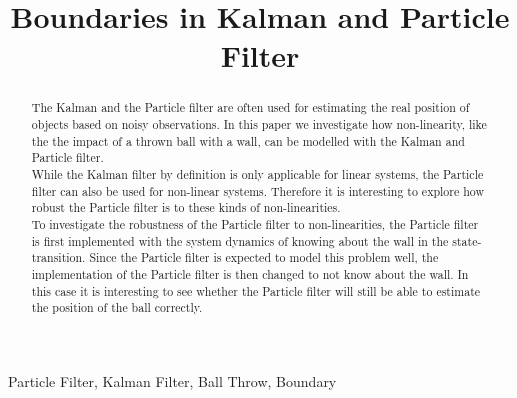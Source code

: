 \documentclass[conference]{IEEEtran}
\begin{document}
\title{Boundaries in Kalman and Particle Filter}

\author{
}
\maketitle

\begin{abstract}
The Kalman and the Particle filter are often used for estimating the real position of objects based on noisy observations.
In this paper we investigate how non-linearity, like the the impact of a thrown ball with a wall, can be modelled with the Kalman and Particle filter. \\
While the Kalman filter by definition is only applicable for linear systems, the Particle filter can also be used for non-linear systems.
Therefore it is interesting to explore how robust the Particle filter is to these kinds of non-linearities. \\
To investigate the robustness of the Particle filter to non-linearities, the Particle filter is first implemented with the system dynamics of knowing about the wall in the state-transition. 
Since the Particle filter is expected to model this problem well, the implementation of the Particle filter is then changed to not know about the wall.
In this case it is interesting to see whether the Particle filter will still be able to estimate the position of the ball correctly. 
\end{abstract}

\begin{IEEEkeywords}
Particle Filter, Kalman Filter, Ball Throw, Boundary
\end{IEEEkeywords}
\end{document}
